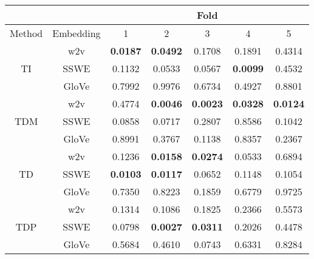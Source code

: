 \begin{tabular}{|c|c|c|c|c|c|c|}
\hline
  &       &  \multicolumn{5}{c|}{Fold} \\
\hline
 Method &   Embedding    &  1 &  2 &  3 &  4 &  5 \\
\hline 
 \multirow{3}{*}{TI} & w2v &      \textbf{0.0187} &      \textbf{0.0492} &      0.1708 &      0.1891 &      0.4314 \\
 & SSWE &      0.1132 &      0.0533 &      0.0567 &      \textbf{0.0099} &      0.4532 \\
 & GloVe &      0.7992 &      0.9976 &      0.6734 &      0.4927 &      0.8801 \\
\hline
 \multirow{3}{*}{TDM} & w2v &      0.4774 &      \textbf{0.0046} &      \textbf{0.0023} &      \textbf{0.0328} &      \textbf{0.0124} \\
 & SSWE &      0.0858 &      0.0717 &      0.2807 &      0.8586 &      0.1042 \\
 & GloVe &      0.8991 &      0.3767 &      0.1138 &      0.8357 &      0.2367 \\
\hline
 \multirow{3}{*}{TD} & w2v &      0.1236 &      \textbf{0.0158} &      \textbf{0.0274} &      0.0533 &      0.6894 \\
 & SSWE &      \textbf{0.0103} &      \textbf{0.0117} &      0.0652 &      0.1148 &      0.1054 \\
 & GloVe &      0.7350 &      0.8223 &      0.1859 &      0.6779 &      0.9725 \\
\hline
 \multirow{3}{*}{TDP} & w2v &      0.1314 &      0.1086 &      0.1825 &      0.2366 &      0.5573 \\
 & SSWE &      0.0798 &      \textbf{0.0027} &      \textbf{0.0311} &      0.2026 &      0.4478 \\
 & GloVe &      0.5684 &      0.4610 &      0.0743 &      0.6331 &      0.8284 \\
\hline
 \end{tabular}